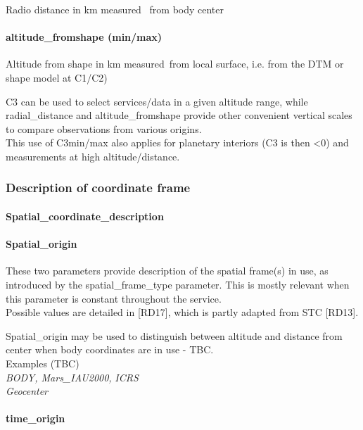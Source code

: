\documentclass[11pt,a4paper]{ivoa}
\begin{document}
Radio distance in km measured  from body center

\paragraph{altitude\_fromshape (min/max)}

Altitude from shape in km measured from local surface, i.e. from the DTM or shape model at C1/C2)

C3 can be used to select services/data in a given altitude range, while radial\_distance and altitude\_fromshape provide other convenient vertical scales to compare observations from various origins.\\This use of C3min/max also applies for planetary interiors (C3 is then <0) and measurements at high altitude/distance. \\

\subsubsection{Description of coordinate frame}

\paragraph{Spatial\_coordinate\_description}

\paragraph{\textbf{Spatial\_origin}}

These two parameters provide description of the spatial frame(s) in use, as introduced by the spatial\_frame\_type parameter. This is mostly relevant when this parameter is constant throughout the service.\\ Possible values are detailed in [RD17], which is partly adapted from STC [RD13].

Spatial\_origin may be used to distinguish between altitude and distance from center when body coordinates are in use - TBC.\\ Examples (TBC)\\ \emph{BODY, Mars\_IAU2000, }\emph{ICRS}\\\emph{Geocenter }

\paragraph{time\_origin}
\end{document}
